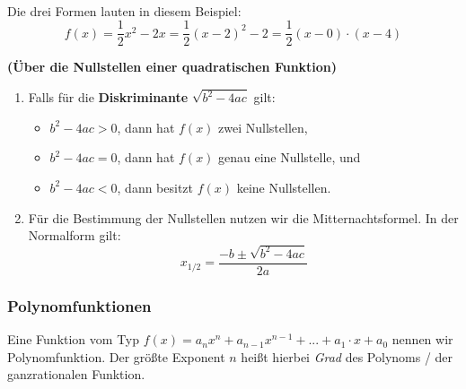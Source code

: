 \documentclass[ngerman, 12pt]{nssheetxea}
\begin{document}
\begin{example} \ \par
\begin{center}
\end{center}
Die drei Formen lauten in diesem Beispiel:
\[ f(x)= \frac{1}{2}x^2 -2x = \frac{1}{2}(x-2)^2-2 = \frac{1}{2} (x-0) \cdot (x-4) \]
\end{example}

\begin{theorem} \textbf{(Über die Nullstellen einer quadratischen Funktion)} \par
\begin{enumerate}
\item Falls für die \textbf{Diskriminante} $\sqrt{b^2-4ac}$ gilt:
	\begin{itemize}
	\item $b^2-4ac>0$, dann hat $f(x)$ zwei Nullstellen,
	\item $b^2-4ac=0$, dann hat $f(x)$ genau eine Nullstelle, und
	\item $b^2-4ac<0$, dann besitzt $f(x)$ keine Nullstellen.
	\end{itemize}
 
\item Für die Bestimmung der Nullstellen nutzen wir die Mitternachtsformel. In der Normalform gilt:
\[ x_{1/2}=\dfrac{-b\pm\sqrt{b^2-4ac}}{2a} \]

\end{enumerate}



\end{theorem}

\subsubsection{Polynomfunktionen}
\begin{definition}
Eine Funktion vom Typ $f(x)=a_nx^n + a_{n-1}x^{n-1} + ... + a_1 \cdot x + a_0$ nennen wir Polynomfunktion. Der größte Exponent $n$ heißt hierbei \textit{Grad} des Polynoms / der ganzrationalen Funktion.
 
\end{definition}
\end{document}
